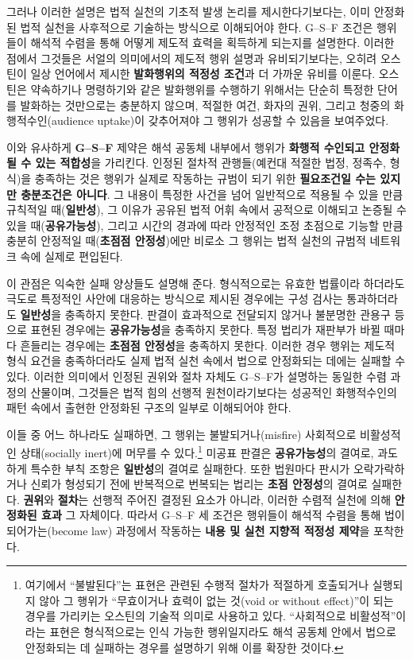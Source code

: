\documentclass[12pt,a4paper]{article}
\begin{document}
그러나 이러한 설명은 법적 실천의 기초적 발생 논리를 제시한다기보다는,
이미 안정화된 법적 실천을 사후적으로 기술하는 방식으로 이해되어야 한다.
G--S--F 조건은 행위들이 해석적 수렴을 통해 어떻게 제도적 효력을 획득하게
되는지를 설명한다. 이러한 점에서 그것들은 서얼의 의미에서의 제도적 행위
설명과 유비되기보다는, 오히려 오스틴이 일상 언어에서 제시한
\textbf{발화행위의 적정성 조건}과 더 가까운 유비를 이룬다. 오스틴은
약속하기나 명령하기와 같은 발화행위를 수행하기 위해서는 단순히 특정한
단어를 발화하는 것만으로는 충분하지 않으며, 적절한 여건, 화자의 권위,
그리고 청중의 화행적수인(audience uptake)이 갖추어져야 그 행위가 성공할
수 있음을 보여주었다.\autocite{Austin1962}

이와 유사하게 \textbf{G--S--F} 제약은 해석 공동체 내부에서 행위가
\textbf{화행적 수인되고 안정화될 수 있는 적합성}을 가리킨다. 인정된
절차적 관행들(예컨대 적절한 법정, 정족수, 형식)을 충족하는 것은 행위가
실제로 작동하는 규범이 되기 위한 \textbf{필요조건일 수는 있지만
충분조건은 아니다}. 그 내용이 특정한 사건을 넘어 일반적으로 적용될 수
있을 만큼 규칙적일 때(\textbf{일반성}), 그 이유가 공유된 법적 어휘
속에서 공적으로 이해되고 논증될 수 있을 때(\textbf{공유가능성}), 그리고
시간의 경과에 따라 안정적인 조정 초점으로 기능할 만큼 충분히 안정적일
때(\textbf{초점점 안정성})에만 비로소 그 행위는 법적 실천의 규범적
네트워크 속에 실제로 편입된다.

이 관점은 익숙한 실패 양상들도 설명해 준다. 형식적으로는 유효한 법률이라
하더라도 극도로 특정적인 사안에 대응하는 방식으로 제시된 경우에는 구성
검사는 통과하더라도 \textbf{일반성}을 충족하지 못한다. 판결이 효과적으로
전달되지 않거나 불분명한 관용구 등으로 표현된 경우에는
\textbf{공유가능성}을 충족하지 못한다. 특정 법리가 재판부가 바뀔 때마다
흔들리는 경우에는 \textbf{초점점 안정성}을 충족하지 못한다. 이러한 경우
행위는 제도적 형식 요건을 충족하더라도 실제 법적 실천 속에서 법으로
안정화되는 데에는 실패할 수 있다. 이러한 의미에서 인정된 권위와 절차
자체도 G--S--F가 설명하는 동일한 수렴 과정의 산물이며, 그것들은 법적
힘의 선행적 원천이라기보다는 성공적인 화행적수인의 패턴 속에서 출현한
안정화된 구조의 일부로 이해되어야 한다.

이들 중 어느 하나라도 실패하면, 그 행위는 불발되거나(misfire) 사회적으로
비활성적인 상태(socially inert)에 머무를 수 있다.\footnote{여기에서
  ``불발된다''는 표현은 관련된 수행적 절차가 적절하게 호출되거나
  실행되지 않아 그 행위가 ``무효이거나 효력이 없는 것(void or without
  effect)''이 되는 경우를 가리키는 오스틴의 기술적 의미로 사용하고 있다.
  \autocite{Austin1962} ``사회적으로 비활성적''이라는 표현은 
  형식적으로는 인식 가능한 행위일지라도 해석 공동체 안에서 법으로
  안정화되는 데 실패하는 경우를 설명하기 위해 이를 확장한 것이다.
  } 미공표 판결은 \textbf{공유가능성}의 결여로,
과도하게 특수한 부칙 조항은 \textbf{일반성}의 결여로 실패한다. 또한
법원마다 판시가 오락가락하거나 신뢰가 형성되기 전에 반복적으로 번복되는
법리는 \textbf{초점 안정성}의 결여로 실패한다. \textbf{권위}와
\textbf{절차}는 선행적 주어진 결정된 요소가 아니라, 이러한 수렴적 실천에
의해 \textbf{안정화된 효과} 그 자체이다. 따라서 G--S--F 세 조건은
행위들이 해석적 수렴을 통해 \textsf{법이 되어가는(become law)} 과정에서
작동하는 \textbf{내용 및 실천 지향적 적정성 제약}을 포착한다.
\end{document}
